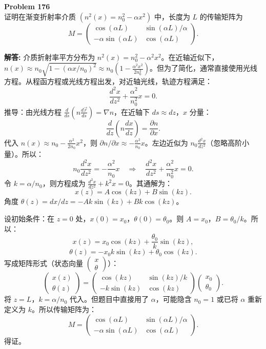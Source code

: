 \documentclass[12pt, a4paper, oneside]{ctexart}
\newenvironment{solution}{\par\noindent\textbf{解答:}\quad}{\par}
\begin{document}
\begin{mdframed}[backgroundcolor=gray!10, linewidth=0pt]
    \textbf{Problem 176} \\
    证明在渐变折射率介质 $\left( n^2(x) = n_0^2 - \alpha x^2 \right)$ 中，长度为 $L$ 的传输矩阵为
    \[
    M = \begin{pmatrix} \cos(\alpha L) & \sin(\alpha L)/\alpha \\ -\alpha \sin(\alpha L) & \cos(\alpha L) \end{pmatrix}.
    \]
\end{mdframed}
\begin{solution}
    介质折射率平方分布为 $n^2(x) = n_0^2 - \alpha^2 x^2$。在近轴近似下，$n(x) \approx n_0 \sqrt{1 - (\alpha x / n_0)^2} \approx n_0 (1 - \frac{\alpha^2 x^2}{2 n_0^2})$。但为了简化，通常直接使用光线方程。从程函方程或光线方程出发，对近轴光线，轨迹方程满足：
    \[
    \frac{d^2 x}{dz^2} + \frac{\alpha^2}{n_0^2} x = 0.
    \]
    推导：由光线方程 $\frac{d}{ds} \left( n \frac{d\vec{r}}{ds} \right) = \nabla n$，在近轴下 $ds \approx dz$，$x$ 分量：
    \[
    \frac{d}{dz} \left( n \frac{dx}{dz} \right) = \frac{\partial n}{\partial x}.
    \]
    代入 $n(x) \approx n_0 - \frac{\alpha^2}{2 n_0} x^2$，则 $\partial n/\partial x \approx -\frac{\alpha^2}{n_0} x$。左边近似为 $n_0 \frac{d^2 x}{dz^2}$（忽略高阶小量）。所以：
    \[
    n_0 \frac{d^2 x}{dz^2} = -\frac{\alpha^2}{n_0} x \quad \Rightarrow \quad \frac{d^2 x}{dz^2} + \frac{\alpha^2}{n_0^2} x = 0.
    \]
    令 $k = \alpha / n_0$，则方程成为 $\frac{d^2 x}{dz^2} + k^2 x = 0$。其通解为：
    \[
    x(z) = A \cos(kz) + B \sin(kz).
    \]
    角度 $\theta(z) = dx/dz = -A k \sin(kz) + B k \cos(kz)$。

    设初始条件：在 $z=0$ 处，$x(0) = x_0$，$\theta(0) = \theta_0$。则 $A = x_0$，$B = \theta_0 / k$。所以：
    \[
    x(z) = x_0 \cos(kz) + \frac{\theta_0}{k} \sin(kz),
    \]
    \[
    \theta(z) = -x_0 k \sin(kz) + \theta_0 \cos(kz).
    \]
    写成矩阵形式（状态向量 $\begin{pmatrix} x \\ \theta \end{pmatrix}$）：
    \[
    \begin{pmatrix} x(z) \\ \theta(z) \end{pmatrix} = \begin{pmatrix} \cos(kz) & \sin(kz)/k \\ -k \sin(kz) & \cos(kz) \end{pmatrix} \begin{pmatrix} x_0 \\ \theta_0 \end{pmatrix}.
    \]
    将 $z = L$，$k = \alpha / n_0$ 代入。但题目中直接用了 $\alpha$，可能隐含 $n_0=1$ 或已将 $\alpha$ 重新定义为 $k$。所以传输矩阵为：
    \[
    M = \begin{pmatrix} \cos(\alpha L) & \sin(\alpha L)/\alpha \\ -\alpha \sin(\alpha L) & \cos(\alpha L) \end{pmatrix}.
    \]
    得证。
\end{solution}
\end{document}
